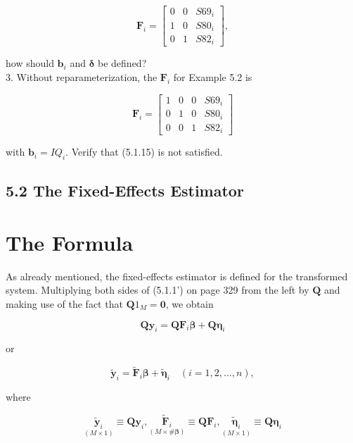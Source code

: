 \documentclass[10pt]{article}
\begin{document}
$$
\mathbf{F}_{i}=\left[\begin{array}{ccc}
0 & 0 & S 69_{i} \\
1 & 0 & S 80_{i} \\
0 & 1 & S 82_{i}
\end{array}\right],
$$

how should $\mathbf{b}_{i}$ and $\boldsymbol{\delta}$ be defined?\\
3. Without reparameterization, the $\mathbf{F}_{i}$ for Example 5.2 is

$$
\mathbf{F}_{i}=\left[\begin{array}{cccc}
1 & 0 & 0 & S 69_{i} \\
0 & 1 & 0 & S 80_{i} \\
0 & 0 & 1 & S 82_{i}
\end{array}\right]
$$

with $\mathbf{b}_{i}=I Q_{i}$. Verify that (5.1.15) is not satisfied.

\subsection*{5.2 The Fixed-Effects Estimator}
\section*{The Formula}
As already mentioned, the fixed-effects estimator is defined for the transformed system. Multiplying both sides of (5.1.1') on page 329 from the left by $\mathbf{Q}$ and making use of the fact that $\mathbf{Q} 1_{M}=\mathbf{0}$, we obtain

$$
\mathbf{Q} \mathbf{y}_{i}=\mathbf{Q} \mathbf{F}_{i} \boldsymbol{\beta}+\mathbf{Q} \boldsymbol{\eta}_{i}
$$

or


\begin{equation*}
\tilde{\mathbf{y}}_{i}=\tilde{\mathbf{F}}_{i} \boldsymbol{\beta}+\tilde{\boldsymbol{\eta}}_{i} \quad(i=1,2, \ldots, n), \tag{5.2.1}
\end{equation*}


where


\begin{equation*}
\underset{(M \times 1)}{\tilde{\mathbf{y}}_{i}} \equiv \mathbf{Q} \mathbf{y}_{i}, \underset{(M \times \# \boldsymbol{\beta})}{\widetilde{\mathbf{F}}_{i}} \equiv \mathbf{Q} \mathbf{F}_{i}, \underset{(M \times 1)}{\tilde{\boldsymbol{\eta}}_{i}} \equiv \mathbf{Q} \boldsymbol{\eta}_{i} \tag{5.2.2}
\end{equation*}
\end{document}
